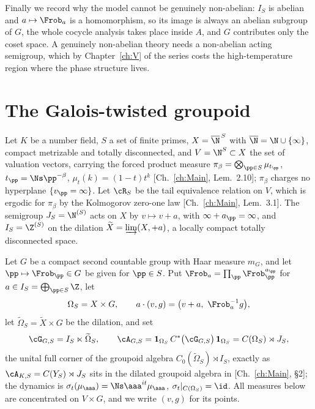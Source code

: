 \begin{summary}
Finally we record why the model cannot be genuinely non-abelian: $I_S$ is abelian and
$a\mapsto\Frob_a$ is a homomorphism, so its image is always an abelian subgroup of $G$, the
whole cocycle analysis takes place inside $A$, and $G$ contributes only the coset space. A
genuinely non-abelian theory needs a non-abelian acting semigroup, which by Chapter~\ref{ch:V} of the
series costs the high-temperature region where the phase structure lives.
\end{summary}

\section{The Galois-twisted groupoid}

Let $K$ be a number field, $S$ a set of finite primes, $X=\overline{\N}^{\,S}$ with
$\overline\N=\N\cup\{\infty\}$, compact metrizable and totally disconnected, and
$V=\N^S\subset X$ the set of valuation vectors, carrying the forced product measure
$\pi_\beta=\bigotimes_{\pp\in S}\mu_{t_\pp}$, $t_\pp=\Ns\pp^{-\beta}$, $\mu_t(k)=(1-t)t^k$
[Ch.~\ref{ch:Main}, Lem.~2.10]; $\pi_\beta$ charges no hyperplane $\{v_\pp=\infty\}$. Let $\cR_S$ be the
tail equivalence relation on $V$, which is ergodic for $\pi_\beta$ by the Kolmogorov
zero-one law [Ch.~\ref{ch:Main}, Lem.~3.1]. The semigroup $J_S=\N^{(S)}$ acts on $X$ by
$v\mapsto v+a$, with $\infty+a_\pp=\infty$, and $I_S=\Z^{(S)}$ on the dilation
$\widetilde X=\varinjlim(X,+a)$, a locally compact totally disconnected space.

\begin{definition}\label{VII:def:groupoid}
Let $G$ be a compact second countable group with Haar measure $m_G$, and let
$\pp\mapsto\Frob_\pp\in G$ be given for $\pp\in S$. Put $\Frob_a=\prod_\pp\Frob_\pp^{a_\pp}$
for $a\in I_S=\bigoplus_{\pp\in S}\Z$, let
\[
\Omega_S=X\times G,\qquad a\cdot(v,g)=\bigl(v+a,\ \Frob_a^{-1}g\bigr),
\]
let $\widetilde\Omega_S=\widetilde X\times G$ be the dilation, and set
\[
\cG_{G,S}=I_S\ltimes\widetilde\Omega_S,\qquad
\cA_{G,S}=\mathbf 1_{\Omega_S}\,C^*\bigl(\cG_{G,S}\bigr)\,\mathbf 1_{\Omega_S}=C(\Omega_S)\rtimes J_S ,
\]
the unital full corner of the groupoid algebra $C_0(\widetilde\Omega_S)\rtimes I_S$, exactly
as $\cA_{K,S}=C(Y_S)\rtimes J_S$ sits in the dilated groupoid algebra in [Ch.~\ref{ch:Main}, \S2]; the
dynamics is $\sigma_t(\mu_\aaa)=\Ns\aaa^{it}\mu_\aaa$, $\sigma_t|_{C(\Omega_S)}=\id$. All
measures below are concentrated on $V\times G$, and we write $(v,g)$ for its points.
\end{definition}

